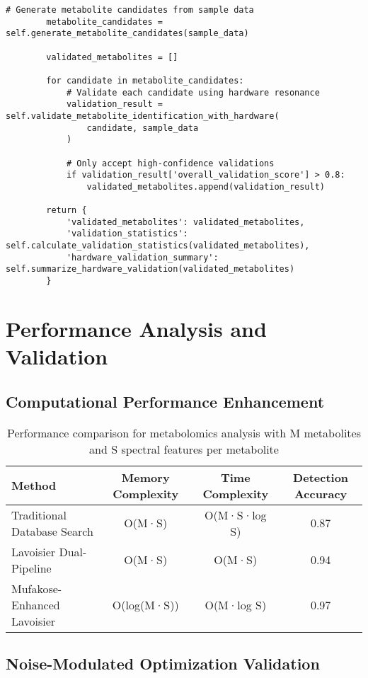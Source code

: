 \documentclass[12pt,a4paper]{article}
\begin{document}
\begin{lstlisting}[style=pythonstyle, caption=Hardware-Assisted Metabolomic Validation]
        # Generate metabolite candidates from sample data
        metabolite_candidates = self.generate_metabolite_candidates(sample_data)
        
        validated_metabolites = []
        
        for candidate in metabolite_candidates:
            # Validate each candidate using hardware resonance
            validation_result = self.validate_metabolite_identification_with_hardware(
                candidate, sample_data
            )
            
            # Only accept high-confidence validations
            if validation_result['overall_validation_score'] > 0.8:
                validated_metabolites.append(validation_result)
        
        return {
            'validated_metabolites': validated_metabolites,
            'validation_statistics': self.calculate_validation_statistics(validated_metabolites),
            'hardware_validation_summary': self.summarize_hardware_validation(validated_metabolites)
        }
\end{lstlisting}

\section{Performance Analysis and Validation}

\subsection{Computational Performance Enhancement}

\begin{table}[H]
\centering
\begin{tabular}{lccc}
\toprule
Method & Memory Complexity & Time Complexity & Detection Accuracy \\
\midrule
Traditional Database Search & O(M·S) & O(M·S·log S) & 0.87 \\
Lavoisier Dual-Pipeline & O(M·S) & O(M·S) & 0.94 \\
Mufakose-Enhanced Lavoisier & O(log(M·S)) & O(M·log S) & 0.97 \\
\bottomrule
\end{tabular}
\caption{Performance comparison for metabolomics analysis with M metabolites and S spectral features per metabolite}
\end{table}

\subsection{Noise-Modulated Optimization Validation}
\end{document}
